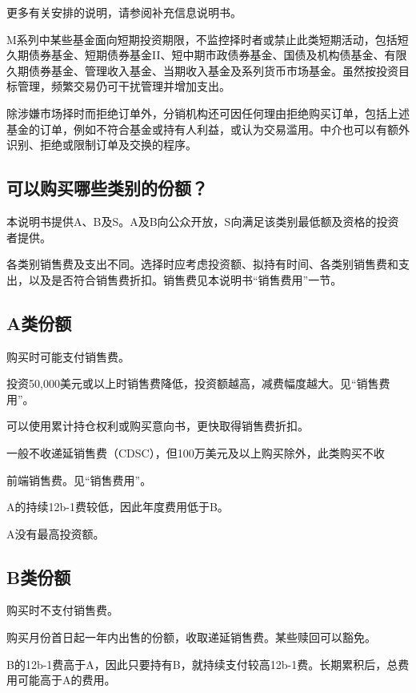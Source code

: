 \documentclass[UTF8,fontset=none,11pt,a4paper]{ctexart}
\begin{document}
更多有关安排的说明，请参阅补充信\allowbreak\mbox{息说明书。}

M系列中某些基金面向短期投资期限，不监控择时者或禁止此类短期活动，包括短久期债券基金、短期债券基金II、短中期市政债券基金、国债及机构债基金、有限久期债券基金、管理收入基金、当期收入基金及系列货币市场基金。虽然按投资目标管理，频繁交易仍可干扰管理并\allowbreak\mbox{增加支出。}

除涉嫌市场择时而拒绝订单外，分销机构还可因任何理由拒绝购买订单，包括上述基金的订单，例如不符合基金或持有人利益，或认为交易滥用。中介也可以有额外识别、拒绝或限制订单及交\allowbreak\mbox{换的程序。}

\subsection*{可以购买哪些类别的份额？}
本说明书提供A、B及S。A及B向公众开放，S向满足该类别最低额及资格的投\allowbreak\mbox{资者提供。}

各类别销售费及支出不同。选择时应考虑投资额、拟持有时间、各类别销售费和支出，以及是否符合销售费折扣。销售费见本说明书“销售费用”一节。

\subsection*{A类份额}
购买时可能支\allowbreak\mbox{付销售费。}

投资50,000美元或以上时销售费降低，投资额越高，减费幅度越大。见“\allowbreak\mbox{销售费用”。}

可以使用累计持仓权利或购买意向书，更快取得销\allowbreak\mbox{售费折扣。}

一般不收递延销售费（CDSC），但100万美元及以上购买除外，此类\allowbreak\mbox{购买不收}


\par{}\label{originalpage10}

前端销售费。见“\allowbreak\mbox{销售费用”。}

A的持续12b-1费较低，因此年度费用低于B。

A没有最\allowbreak\mbox{高投资额。}

\subsection*{B类份额}
购买时不支\allowbreak\mbox{付销售费。}

购买月份首日起一年内出售的份额，收取递延销售费。某些赎回\allowbreak\mbox{可以豁免。}

B的12b-1费高于A，因此只要持有B，就持续支付较高12b-1费。长期累积后，总费用可能高于A的费用。
\end{document}
